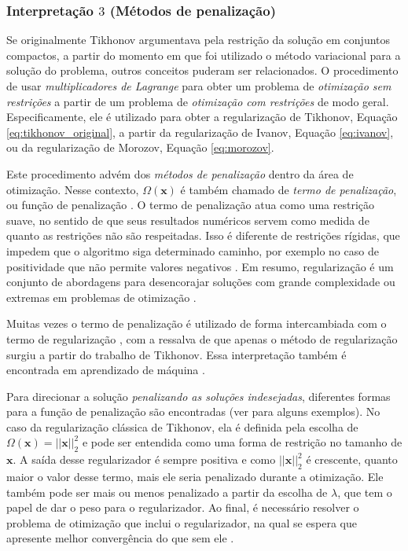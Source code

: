 \subsubsection{Interpretação $3$ (Métodos de penalização)}

Se originalmente Tikhonov argumentava pela restrição da solução em conjuntos compactos, a partir do momento em que foi utilizado o método variacional para a solução do problema, outros conceitos puderam ser relacionados. O procedimento de usar \textit{multiplicadores de Lagrange} para obter um problema de \textit{otimização sem restrições} a partir de um problema de \textit{otimização com restrições} de modo geral. Especificamente, ele é utilizado para obter a regularização de Tikhonov, Equação \eqref{eq:tikhonov_original}, a partir da regularização de Ivanov, Equação \eqref{eq:ivanov}, ou da regularização de Morozov, Equação \eqref{eq:morozov}.

Este procedimento advém dos \textit{métodos de penalização} dentro da área de otimização. Nesse contexto, $\Omega(\mathbf{x})$ é também chamado de \textit{termo de penalização}, ou função de penalização \cite[pág. 398]{luenberger2015linear}. O termo de penalização atua como uma restrição suave, no sentido de que seus resultados numéricos servem como medida de quanto as restrições não são respeitadas. Isso é diferente de restrições rígidas, que impedem que o algoritmo siga determinado caminho, por exemplo no caso de positividade que não permite valores negativos \cite[pág. 20]{andreasson2020an}. Em resumo, regularização é um conjunto de abordagens para desencorajar soluções com grande complexidade ou extremas em problemas de otimização \cite[Exemplo 8.3]{Deisenroth2020}.

Muitas vezes o termo de penalização é utilizado de forma intercambiada com o termo de regularização \cite[pág. 263]{Deisenroth2020}, com a ressalva de que apenas o método de regularização surgiu a partir do trabalho de Tikhonov. Essa interpretação também é encontrada em aprendizado de máquina \cite[pág. 70]{cherkassky2007learning}.


Para direcionar a solução \textit{penalizando as soluções indesejadas}, diferentes formas para a função de penalização são encontradas (ver \cite[pág. 404]{luenberger2015linear} para alguns exemplos). No caso da regularização clássica de Tikhonov, ela é definida pela escolha de $\Omega(\mathbf{x}) = \vert \vert \mathbf{x} \vert \vert_2^2$ e pode ser entendida como uma forma de restrição no tamanho de $\mathbf{x}$. A saída desse regularizador é sempre positiva e como $\vert \vert \mathbf{x} \vert \vert_2^2$ é crescente, quanto maior o valor desse termo, mais ele seria penalizado durante a otimização. Ele também pode ser mais ou menos penalizado a partir da escolha de $\lambda$, que tem o papel de dar o peso para o regularizador. Ao final, é necessário resolver o problema de otimização que inclui o regularizador, na qual se espera que apresente melhor convergência do que sem ele \cite{Kaji2019}.





